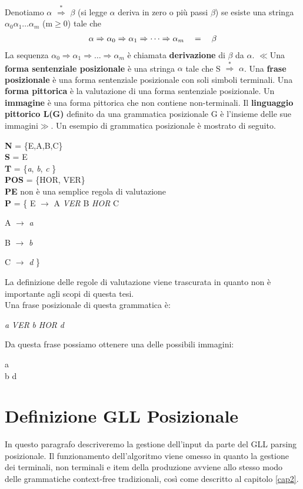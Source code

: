 Denotiamo $\alpha$ $\overset{*}{\Rightarrow}$ $\beta$ (si legge  $\alpha$ deriva in zero o più passi $\beta$) se esiste una stringa $\alpha_0$$\alpha_1$$\dots$$\alpha_m$ (m$\ge$0) tale che
\begin{align}
	\alpha \Rightarrow \alpha_0 \Rightarrow \alpha_1 \Rightarrow \dots \Rightarrow  \alpha_m \quad = \quad \beta  \notag
\end{align}
La sequenza $\alpha_0$$\Rightarrow$$\alpha_1$$\Rightarrow$$\dots$$\Rightarrow$$\alpha_m$ è chiamata \textbf{derivazione} di $\beta$ da $\alpha$. $\ll$Una \textbf{forma sentenziale posizionale} è una stringa $\alpha$ tale che S $\overset{*}{\Rightarrow}$ $\alpha$. Una \textbf{frase posizionale} è una forma sentenziale posizionale con soli simboli terminali. Una \textbf{forma pittorica} è la valutazione di una forma sentenziale posizionale. Un \textbf{immagine} è una forma pittorica che non contiene non-terminali. Il \textbf{linguaggio pittorico L(G)} definito da una grammatica posizionale G è l'insieme delle sue immagini$\gg$. Un esempio di grammatica posizionale è mostrato di seguito.
\begin{center}
	\textbf{N} = \{E,A,B,C\} \\
	\textbf{S} = E  \\
	\textbf{T} =  \{\textit{a}, \textit{b}, \textit{c} \} \\
	\textbf{POS}  = \{HOR, VER\}\\
	\textbf{PE} non è una semplice regola di valutazione\\
	\hspace{1.8cm}\textbf{P}  = \{ E $\to$ A \textit{VER} B \textit{HOR} C \par 
		A $\to$ \textit{a} \par 
	    B $\to$ \textit{b}  \par 
	    \hspace{0.3cm} C $\to$ \textit{d}  \}   
\end{center}
La definizione delle regole di valutazione viene trascurata in quanto non è importante agli scopi di questa tesi.\\
Una frase posizionale di questa grammatica è:
\begin{center}
	\textit{a} \textit{VER} \textit{b} \textit{HOR} \textit{d} 
\end{center}
Da questa frase possiamo ottenere una delle possibili immagini:
\begin{center}
	  a  \\ 
	 b \quad  d 
\end{center}
\section{Definizione GLL Posizionale}
In questo paragrafo descriveremo la gestione dell'input da parte del GLL parsing posizionale. Il funzionamento dell'algoritmo viene omesso in quanto la gestione dei terminali, non terminali e item della produzione avviene allo stesso modo delle grammatiche context-free tradizionali, così come descritto al capitolo \ref{cap2}.

